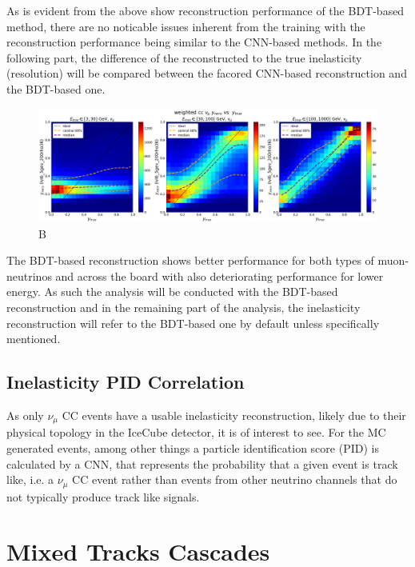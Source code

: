 \documentclass[a4paper,12pt,numbered]{article}
\begin{document}
As is evident from the above show reconstruction performance of the BDT-based method, there are no noticable issues inherent from the training with the reconstruction performance being similar to the CNN-based methods. In the following part, the difference of the reconstructed to the true inelasticity (resolution) will be compared between the facored CNN-based reconstruction and the BDT-based one.

\begin{figure}[H]
\centering
\includegraphics[width=\textwidth]{Graphics/Inelasticity/WithCentral68/weighted/weighted_cc_ytruevsyreco_lvl6_5gev_200rho36_numu.png}
\caption{B}
\end{figure}

The BDT-based reconstruction shows better performance for both types of muon-neutrinos and across the board with also deteriorating performance for lower energy. As such the analysis will be conducted with the BDT-based reconstruction and in the remaining part of the analysis, the inelasticity reconstruction will refer to the BDT-based one by default unless specifically mentioned.

\subsection{Inelasticity PID Correlation}

As only $\nu_\mu$ CC events have a usable inelasticity reconstruction, likely due to their physical topology in the IceCube detector, it is of interest to see. For the MC generated events, among other things a particle identification score (PID) is calculated by a CNN, that represents the probability that a given event is track like, i.e. a $\nu_\mu$ CC event rather than events from other neutrino channels that do not typically produce track like signals.

\section{Mixed Tracks Cascades}
\end{document}
